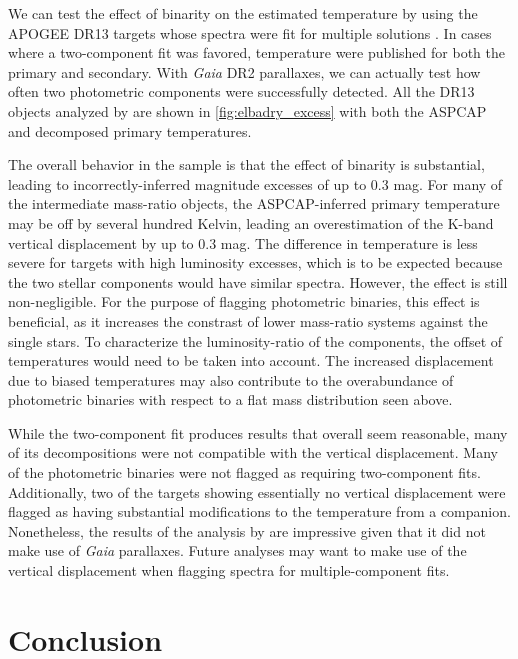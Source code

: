 \documentclass[manuscript]{aastex6}
\newcommand{\Gaia}{\mbox{\textit{Gaia}}}
\begin{document}
We can test the effect of binarity on the estimated temperature by using the
APOGEE DR13 targets whose spectra were fit for multiple solutions
\citep{ElBadry18b}. In cases where a two-component fit was favored, temperature
were published for both the primary and secondary. With \Gaia{} DR2 parallaxes,
we can actually test how often two photometric components were successfully
detected. All the DR13 objects analyzed by \citet{ElBadry18b} are shown in
\cref{fig:elbadry_excess} with both the ASPCAP and decomposed primary 
temperatures.

The overall behavior in the \citet{ElBadry18b} sample is that the effect of 
binarity is substantial, leading to incorrectly-inferred magnitude excesses of
up to 0.3 mag. For many of the intermediate mass-ratio objects, the 
ASPCAP-inferred primary temperature may be off by several hundred Kelvin, 
leading an overestimation of the K-band vertical displacement by up to 0.3 
mag. The difference in temperature is less severe for targets with high 
luminosity excesses, which is to be expected because the two stellar 
components would have similar spectra. However, the effect is still 
non-negligible. For the purpose of flagging photometric binaries, this effect
is beneficial, as it increases the constrast of lower mass-ratio systems
against the single stars. To characterize the luminosity-ratio of the 
components, the offset of temperatures would need to be taken into account. 
The increased displacement due to biased temperatures may also contribute 
to the overabundance of photometric binaries with respect to a flat mass 
distribution seen above. 

While the two-component fit produces results that overall seem reasonable, many
of its decompositions were not compatible with the vertical displacement. Many
of the photometric binaries were not flagged as requiring two-component fits.
Additionally, two of the targets showing essentially no vertical displacement
were flagged as having substantial modifications to the temperature from a
companion. Nonetheless, the results of the analysis by \citet{ElBadry18b} are
impressive given that it did not make use of \Gaia{} parallaxes. Future
analyses may want to make use of the vertical displacement when flagging
spectra for multiple-component fits.

\section{Conclusion}
\label{sec:conclusions}
\end{document}
